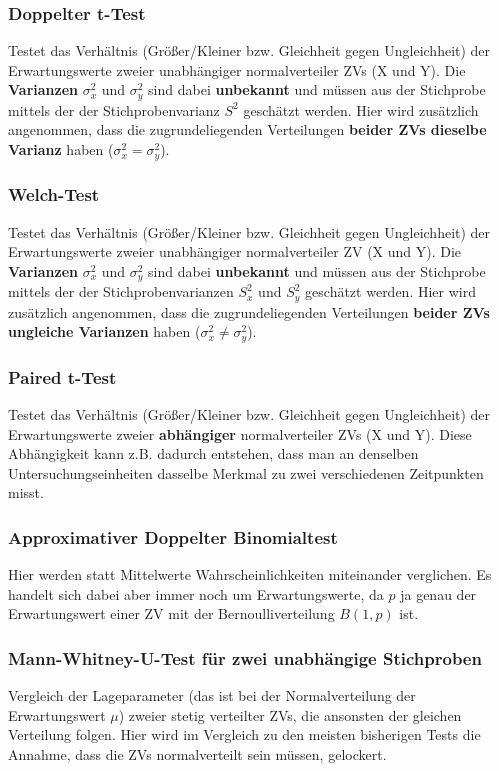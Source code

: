 \documentclass[a4paper]{article}
\begin{document}
\subsubsection{Doppelter t-Test}\label{sec:tTest2}
Testet das Verhältnis (Größer/Kleiner bzw. Gleichheit gegen Ungleichheit) der Erwartungswerte zweier unabhängiger normalverteiler ZVs (X und Y). Die \textbf{Varianzen} $\sigma_x^2$ und $\sigma_y^2$ sind dabei \textbf{unbekannt} und müssen aus der Stichprobe mittels der der Stichprobenvarianz $S^2$ geschätzt werden. Hier wird zusätzlich angenommen, dass die zugrundeliegenden Verteilungen \textbf{beider ZVs dieselbe Varianz} haben ($\sigma_x^2 =\sigma_y^2$). 

\subsubsection{Welch-Test}\label{sec:Welch}
Testet das Verhältnis (Größer/Kleiner bzw. Gleichheit gegen Ungleichheit) der Erwartungswerte zweier unabhängiger normalverteiler ZV (X und Y). Die \textbf{Varianzen} $\sigma_x^2$ und $\sigma_y^2$ sind dabei \textbf{unbekannt} und müssen aus der Stichprobe mittels der der Stichprobenvarianzen $S_x^2$ und $S_y^2$ geschätzt werden. Hier wird zusätzlich angenommen, dass die zugrundeliegenden Verteilungen \textbf{beider ZVs ungleiche Varianzen} haben ($\sigma_x^2 \neq \sigma_y^2$). 

\subsubsection{Paired t-Test}\label{sec:paired}
Testet das Verhältnis (Größer/Kleiner bzw. Gleichheit gegen Ungleichheit) der Erwartungswerte zweier \textbf{abhängiger} normalverteiler ZVs (X und Y). Diese Abhängigkeit kann z.B. dadurch entstehen, dass man an denselben Untersuchungseinheiten dasselbe Merkmal zu zwei verschiedenen Zeitpunkten misst. 

\subsubsection{Approximativer Doppelter Binomialtest}\label{sec:bintest2}
Hier werden statt Mittelwerte Wahrscheinlichkeiten miteinander verglichen. Es handelt sich dabei aber immer noch um Erwartungswerte, da $p$ ja genau der Erwartungswert einer ZV mit der Bernoulliverteilung $B(1,p)$ ist.

\subsubsection{Mann-Whitney-U-Test für zwei unabhängige Stichproben}\label{sec:MWUtest}
Vergleich der Lageparameter (das ist bei der Normalverteilung der Erwartungswert $\mu$) zweier stetig verteilter ZVs, die ansonsten der gleichen Verteilung folgen. Hier wird im Vergleich zu den meisten bisherigen Tests die Annahme, dass die ZVs normalverteilt sein müssen, gelockert.
\end{document}
